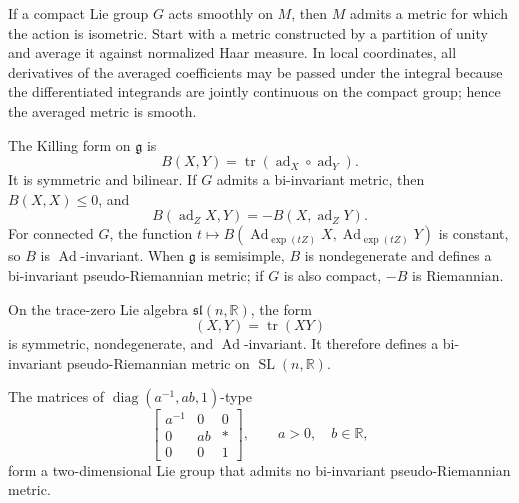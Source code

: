 \begin{remark}
  \label{rem:pet-ch1-ex-26}


  If a compact Lie group $G$ acts smoothly on $M$, then $M$ admits a metric
  for which the action is isometric. Start with a metric constructed by a
  partition of unity and average it against normalized Haar measure.
  In local coordinates, all derivatives of the averaged coefficients may be
  passed under the integral because the differentiated integrands are jointly
  continuous on the compact group; hence the averaged metric is smooth.
\end{remark}

\begin{remark}
  \label{rem:pet-ch1-ex-27}


  The Killing form on $\mathfrak g$ is
  \[
    B(X,Y)=\operatorname{tr}(\operatorname{ad}_X\circ\operatorname{ad}_Y).
  \]
  It is symmetric and bilinear. If $G$ admits a bi-invariant metric, then
  $B(X,X)\le0$, and
  \[
    B(\operatorname{ad}_ZX,Y)=-B(X,\operatorname{ad}_ZY).
  \]
  For connected $G$, the function
  $t\mapsto B(\operatorname{Ad}_{\exp(tZ)}X,
              \operatorname{Ad}_{\exp(tZ)}Y)$ is constant, so $B$ is
  $\operatorname{Ad}$-invariant. When $\mathfrak g$ is semisimple, $B$ is
  nondegenerate and defines a bi-invariant pseudo-Riemannian metric; if $G$ is
  also compact, $-B$ is Riemannian.
\end{remark}

\begin{remark}
  \label{rem:pet-ch1-ex-28}


  On the trace-zero Lie algebra $\mathfrak{sl}(n,\mathbb{R})$, the form
  \[
    (X,Y)=\operatorname{tr}(XY)
  \]
  is symmetric, nondegenerate, and $\operatorname{Ad}$-invariant. It therefore
  defines a bi-invariant pseudo-Riemannian metric on
  $\operatorname{SL}(n,\mathbb{R})$.
\end{remark}

\begin{remark}
  \label{rem:pet-ch1-ex-29}


  The matrices of $\operatorname{diag}(a^{-1},ab,1)$-type
  \[
    \left[\begin{smallmatrix}
      a^{-1}&0&0\\0&ab&\ast\\0&0&1
    \end{smallmatrix}\right],
    \qquad a>0,\quad b\in\mathbb{R},
  \]
  form a two-dimensional Lie group that admits no bi-invariant
  pseudo-Riemannian metric.
\end{remark}
